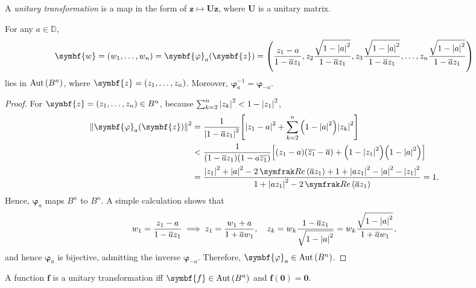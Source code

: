A \textit{unitary transformation} is a map in the form of \(\symbf{z}\mapsto\symbf{U}\symbf{z}\), where \(\symbf{U}\) is a unitary matrix.
\begin{proposition}\label{prop:unitballsimpleautomorphism}
    For any \(a\in\mathbb{D}\),
    \begin{equation}
        \symbf{w}=\qty(w_1,\dots,w_n)=\symbf{\varphi}_{a}(\symbf{z})=\qty(\frac{z_1-a}{1-\overline{a}z_1},z_2\frac{\sqrt{1-\abs{a}^2}}{1-\overline{a}z_1},z_3\frac{\sqrt{1-\abs{a}^2}}{1-\overline{a}z_1},\ldots,z_n\frac{\sqrt{1-\abs{a}^2}}{1-\overline{a}z_1})\label{eq:unitballsimpleautomorphism_statement}
    \end{equation} lies in \(\operatorname{Aut}\qty(B^n)\), where \(\symbf{z}=\qty(z_1,\dots,z_n)\). Moreover, \(\symbf{\varphi}_a^{-1}=\symbf{\varphi}_{-a}\).
\end{proposition}
\begin{proof}
    For \(\symbf{z}=\qty(z_1,\dots,z_n)\in B^n\), because \(\sum_{k=2}^n\abs{z_k}^2<1-\abs{z_1}^2\),
    \begin{align*}
        \norm{\symbf{\varphi}_a(\symbf{z})}^2 & =\frac{1}{\abs{1-\overline{a}z_1}^2}\qty[\abs{z_1-a}^2+\sum_{k=2}^n\qty(1-\abs{a}^2)\abs{z_k}^2]                                                 \\
                                         & <\frac{1}{\qty(1-\overline{a}z_1)\qty(1-a\overline{z_1})}\qty[\qty(z_1-a)\qty(\overline{z_1}-\overline{a})+\qty(1-\abs{z_1}^2)\qty(1-\abs{a}^2)] \\
                                         & =\frac{\abs{z_1}^2+\abs{a}^2-2\Re\qty(\overline{a}z_1)+1+\abs{az_1}^2-\abs{a}^2-\abs{z_1}^2}{1+\abs{az_1}^2-2\Re\qty(\overline{a}z_1)}=1.
    \end{align*}
    Hence, \(\symbf{\varphi}_a\) maps \(B^n\) to \(B^n\). A simple calculation shows that \[w_1=\frac{z_1-a}{1-\overline{a}z_1}\implies z_1=\frac{w_1+a}{1+\overline{a}w_1},\quad z_k=w_k\frac{1-\overline{a}z_1}{\sqrt{1-\abs{a}^2}}=w_k\frac{\sqrt{1-\abs{a}^2}}{1+\overline{a}w_1},\] and hence \(\symbf{\varphi}_a\) is bijective, admitting the inverse \(\symbf{\varphi}_{-a}\). Therefore, \(\symbf{\varphi}_a\in\Aut\qty(B^n)\).
\end{proof}
\begin{proposition}\label{prop:unitballautomorphismfixedpointatzero}
    A function \(\symbf{f}\) is a unitary transformation iff \(\symbf{f}\in\Aut\qty(B^n)\) and \(\symbf{f}(\symbf{0})=\symbf{0}\).
\end{proposition}
